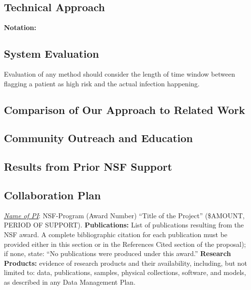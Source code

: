\subsection{Technical Approach}
{\bf Notation:} 





\subsection{System Evaluation}
Evaluation of any method should consider the length of time window between flagging a patient as high risk and the actual infection happening.

\subsection{Comparison of Our Approach to Related Work}

\subsection{Community Outreach and Education}

\subsection{Results from Prior NSF Support}

\subsection{Collaboration Plan}

\noindent
\emph{\underline{Name of PI}}: NSF-Program (Award Number) ``Title of the Project'' (\$AMOUNT, PERIOD OF SUPPORT).
{\bf Publications:} List of publications resulting from the NSF award. A complete bibliographic citation for each
publication must be provided either in this section or in the References Cited section of the proposal); if
none, state: ``No publications were produced under this award.'' {\bf Research Products:} evidence of research products
and their availability, including, but not limited to: data, publications, samples, physical collections, software,
and models, as described in any Data Management Plan.
